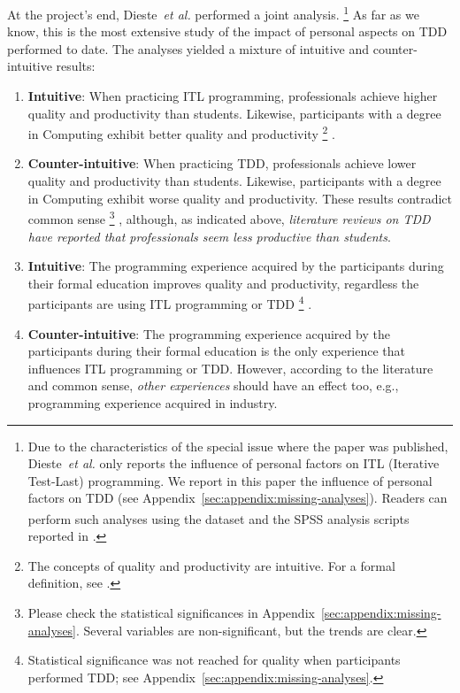 \documentclass[10pt,conference]{IEEEtran}\usepackage[]{graphicx}\usepackage[table,xcdraw]{xcolor}
\newcommand{\etal}[0]{~\textit{et al.}}
\begin{document}
At the project's end, Dieste\etal \cite{dieste2018empirical} performed a joint analysis.%
\footnote{Due to the characteristics of the special issue where the paper was published, Dieste\etal \cite{dieste2018empirical} only reports the influence of personal factors on ITL (Iterative Test-Last) programming. We report in this paper the influence of personal factors on TDD (see Appendix~\ref{sec:appendix:missing-analyses}). Readers can perform such analyses using the dataset and the SPSS\textsuperscript{\textcopyright} analysis scripts reported in \cite{dieste2018empirical}.}
As far as we know, this is the most extensive study of the impact of personal aspects on TDD performed to date. The analyses yielded a mixture of intuitive and counter-intuitive results:
\begin{enumerate}
     \item \textbf{Intuitive}: When practicing ITL programming, professionals achieve higher quality and productivity than students. Likewise, participants with a degree in Computing exhibit better quality and productivity%
\footnote{The concepts of quality and productivity are intuitive. For a formal definition, see \cite{dieste2018empirical}.}%
.
     \item \textbf{Counter-intuitive}\label{item:counter:2}: When practicing TDD, professionals achieve lower quality and productivity than students. Likewise, participants with a degree in Computing exhibit worse quality and productivity. These results contradict common sense%
\footnote{Please check the statistical significances in Appendix~\ref{sec:appendix:missing-analyses}. Several variables are non-significant, but the trends are clear.}%
, although, as indicated above, \textit{literature reviews on TDD have reported that professionals seem less productive than students}.
     \item \textbf{Intuitive}: The programming experience acquired by the participants during their formal education improves quality and productivity, regardless the participants are using ITL programming or TDD%
\footnote{Statistical significance was not reached for quality when participants performed TDD; see Appendix~\ref{sec:appendix:missing-analyses}.}%
.
     \item \textbf{Counter-intuitive}\label{item:counter:4}: The programming experience acquired by the participants during their formal education is the only experience that influences ITL programming or TDD. However, according to the literature and common sense, \textit{other experiences} should have an effect too, e.g., programming experience acquired in industry.
\end{enumerate}
\end{document}
